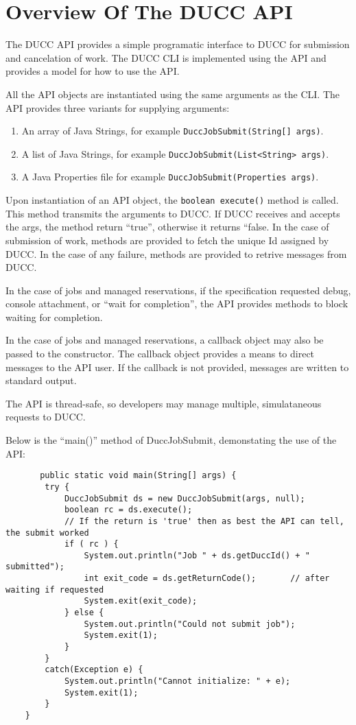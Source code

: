 \section{Overview Of The DUCC API}

   The DUCC API provides a simple programatic interface to DUCC for submission and
   cancelation of work.  The DUCC CLI is implemented using the API and provides a
   model for how to use the API.

   All the API objects are instantiated using the same arguments as the CLI.  The API
   provides three variants for supplying arguments:
   \begin{enumerate}
     \item An array of Java Strings, for example {\tt DuccJobSubmit(String[] args)}.
     \item A list of Java Strings,   for example {\tt DuccJobSubmit(List<String> args)}.
     \item A Java Properties file for example {\tt DuccJobSubmit(Properties args)}.
   \end{enumerate}

   Upon instantiation of an API object, the {\tt boolean execute()} method is called.  This
   method transmits the arguments to DUCC.  If DUCC receives and accepts the args, the method
   return ``true'', otherwise it returns ``false.  In the case of submission of work, methods
   are provided to fetch the unique Id assigned by DUCC.  In the case of any failure, methods
   are provided to retrive messages from DUCC.

   In the case of jobs and managed reservations, if the specification requested debug,
   console attachment, or ``wait for completion'', the API provides methods to block
   waiting for completion.

   In the case of jobs and managed reservations, a callback object may also be passed to
   the constructor.  The callback object provides a means to direct messages to the
   API user.  If the callback is not provided, messages are written to standard output.

   The API is thread-safe, so developers may manage multiple, simulataneous requests to
   DUCC.

   Below is the ``main()'' method of DuccJobSubmit, demonstating the use of the API:
\begin{verbatim}   
       public static void main(String[] args) {
        try {
            DuccJobSubmit ds = new DuccJobSubmit(args, null);
            boolean rc = ds.execute();
            // If the return is 'true' then as best the API can tell, the submit worked
            if ( rc ) {                
                System.out.println("Job " + ds.getDuccId() + " submitted");
                int exit_code = ds.getReturnCode();       // after waiting if requested
                System.exit(exit_code);
            } else {
                System.out.println("Could not submit job");
                System.exit(1);
            }
        }
        catch(Exception e) {
            System.out.println("Cannot initialize: " + e);
            System.exit(1);
        }
    }
\end{verbatim}

